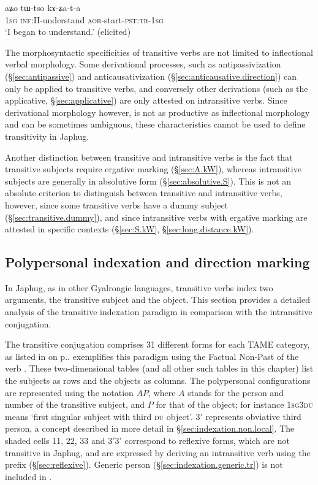 \begin{exe}
\ex   \label{ex:tWtso.kAZata}
\gll aʑo tɯ-tso kɤ-ʑa-t-a \\
\textsc{1sg} \textsc{inf}:II-understand \textsc{aor}-start-\textsc{pst}:\textsc{tr}-\textsc{1sg} \\
\glt `I began to understand.' (elicited)
\end{exe}

The morphosyntactic specificities of transitive verbs are not limited to inflectional verbal morphology. Some derivational processes, such as antipassivization (§\ref{sec:antipassive}) and anticausativization (§\ref{sec:anticausative.direction}) can only be applied to transitive verbs, and conversely other derivations (such as the applicative, §\ref{sec:applicative}) are only attested on intransitive verbs. Since derivational morphology however, is not as productive as inflectional morphology and can be sometimes ambiguous, these characteristics cannot be used to define transitivity in Japhug.

Another distinction between transitive and intransitive verbs is the fact that transitive subjects require ergative marking (§\ref{sec:A.kW}), whereas intransitive subjects are generally in absolutive form (§\ref{sec:absolutive.S}). This is not an absolute criterion to distinguish between transitive and intransitive verbs, however, since some transitive verbs have a dummy subject (§\ref{sec:transitive.dummy}), and since intransitive verbs with ergative marking are attested in specific contexts (§\ref{sec:S.kW}, §\ref{sec:long.distance.kW}).

\subsection{Polypersonal indexation and direction marking} \label{sec:polypersonal}
In Japhug, as in other Gyalrongic languages, transitive verbs index two arguments, the transitive subject and the object.  This section provides a detailed analysis of the transitive indexation paradigm in comparison with the intransitive conjugation.

The transitive conjugation comprises 31 different forms for each TAME category, as listed in  on p.\pageref{tab:japhug.tr}.  exemplifies this paradigm using the Factual Non-Past of the verb . These two-dimensional tables (and all other such tables in this chapter) list the subjects as rows and the objects as columns. The polypersonal configurations are represented using the notation $A$\fl{}$P$, where $A$ stands for the person and number of the transitive subject, and $P$ for that of the object; for instance \textsc{1sg}\fl{}\textsc{3du} means `first singular subject with third \textsc{du} object'. 3$'$ represents obviative third person, a concept described in more detail in §\ref{sec:indexation.non.local}. The shaded cells 1\fl{}1, 2\fl{}2, 3\fl{}3 and 3$'$\fl{}3$'$ correspond to reflexive forms, which are not transitive in Japhug, and are expressed by deriving an intransitive verb using the prefix  (§\ref{sec:reflexive}). Generic person (§\ref{sec:indexation.generic.tr}) is not included in .

